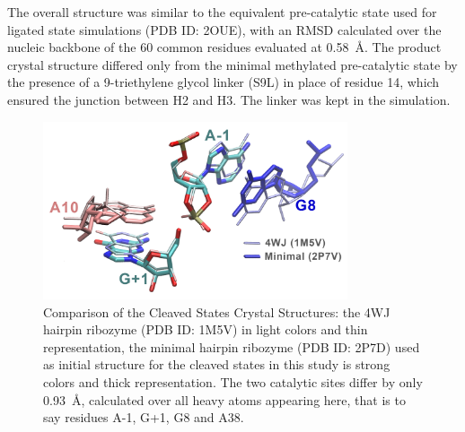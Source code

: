 \documentclass[journal=jacsat,manuscript=article]{achemso}
\begin{document}
\begin{suppinfo}

The overall structure was similar to the equivalent pre-catalytic state used for ligated state simulations (PDB ID: 2OUE), 
with an RMSD calculated over the nucleic backbone of the 60 common residues evaluated at 0.58~\AA.
The product crystal structure differed only from the minimal methylated pre-catalytic state
by the presence of a 9-triethylene glycol linker (S9L) in place of residue 14, which ensured the junction between H2 and H3.
The linker was kept in the simulation.


\begin{figure}[ht]
    \centering
    \includegraphics[width=0.8\textwidth]{figures_SI/Crystal_Cleaved_States.png}
    \caption[Comparison of the Cleaved States Crystal Structures]
    {Comparison of the Cleaved States Crystal Structures: 
    the 4WJ hairpin ribozyme (PDB ID: 1M5V) in light colors and thin representation, 
    the minimal hairpin ribozyme (PDB ID: 2P7D) used as initial structure for the cleaved states in this study is strong colors and thick representation.
    The two catalytic sites differ by only 0.93~\AA, calculated over all heavy atoms appearing here, 
    that is to say residues A-1, G+1, G8 and A38.}
    \label{fig:cleaved_crystals}
\end{figure}



\end{suppinfo}
\end{document}
